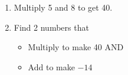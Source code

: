 \documentclass{article}
\begin{document}
\begin{minipage}{0.4\textwidth}
\begin{enumerate}
    \item Multiply 5 and 8 to get 40.
    \item Find 2 numbers that
    \begin{itemize}
        \item Multiply to make 40 AND
        \item Add to make $-14$
    \end{itemize}
\end{enumerate}
\end{minipage}
\hspace{1in}
\begin{minipage}{0.3\textwidth}
\end{minipage}

\vspace{0.5in} 





\end{document}
